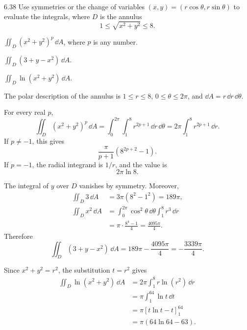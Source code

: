\documentclass[11pt,oneside]{article}
\begin{document}
\begin{problem}{6.38}
Use symmetries or the change of variables
$(x, y)=(r\cos\theta, r\sin\theta)$ to evaluate the integrals,
where $D$ is the annulus
\[
    1\le\sqrt{x^2+y^2}\le8.
\]
\begin{problemsubparts}
    \item $\displaystyle\iint_D(x^2+y^2)^p\,\dd A$,
          where $p$ is any number.
    \item $\displaystyle\iint_D(3+y-x^2)\,\dd A$.
    \item $\displaystyle\iint_D\ln(x^2+y^2)\,\dd A$.
\end{problemsubparts}
\end{problem}
\begin{solution}
The polar description of the annulus is $1\le r\le8$,
$0\le\theta\le2\pi$, and $\dd A=r\,\dd r\,\dd\theta$.
\begin{problemsubparts}
    \item For every real $p$,
    \[
        \iint_D(x^2+y^2)^p\,\dd A
        =\int_0^{2\pi}\int_1^8r^{2p+1}\,\dd r\,\dd\theta
        =2\pi\int_1^8r^{2p+1}\,\dd r.
    \]
    If $p\ne-1$, this gives
    \[
        \boxed{\frac{\pi}{p+1}\left(8^{2p+2}-1\right)}.
    \]
    If $p=-1$, the radial integrand is $1/r$, and the value is
    \[
        \boxed{2\pi\ln8}.
    \]
    \item The integral of $y$ over $D$ vanishes by symmetry.
    Moreover,
    \[
    \begin{aligned}
        \iint_D3\,\dd A
        &=3\pi(8^2-1^2)=189\pi, \\
        \iint_Dx^2\,\dd A
        &=\int_0^{2\pi}\cos^2\theta\,\dd\theta
          \int_1^8r^3\,\dd r\\
        &=\pi\cdot\frac{8^4-1}{4}
         =\frac{4095\pi}{4}.
    \end{aligned}
    \]
    Therefore
    \[
        \boxed{\iint_D(3+y-x^2)\,\dd A
        =189\pi-\frac{4095\pi}{4}
        =-\frac{3339\pi}{4}}.
    \]
    \item Since $x^2+y^2=r^2$, the substitution $t=r^2$
    gives
    \[
    \begin{aligned}
        \iint_D\ln(x^2+y^2)\,\dd A
        &=2\pi\int_1^8r\ln(r^2)\,\dd r\\
        &=\pi\int_1^{64}\ln t\,\dd t\\
        &=\pi\left[t\ln t-t\right]_1^{64}\\
        &=\boxed{\pi\left(64\ln64-63\right)}.
    \end{aligned}
    \]
\end{problemsubparts}
\end{solution}
\end{document}
